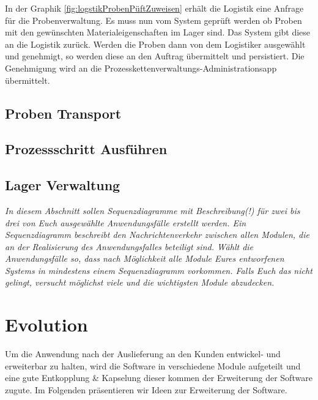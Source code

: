\documentclass[enabledeprecatedfontcommands,fontsize=12pt,paper=a4,twoside]{scrartcl}
\begin{document}
In der Graphik \ref{fig:logstikProbenPüftZuweisen} erhält die Logistik eine Anfrage für die Probenverwaltung. Es muss nun vom System geprüft werden ob Proben mit den gewünschten Materialeigenschaften im Lager sind. Das System gibt diese an die Logistik zurück. Werden die Proben dann von dem Logistiker ausgewählt und genehmigt, so werden diese an den Auftrag übermittelt und persistiert. Die Genehmigung wird an die Prozesskettenverwaltungs-Administrationsapp übermittelt.

\subsection{Proben Transport}
\subsection{Prozessschritt Ausführen}
\subsection{Lager Verwaltung}



{\it In diesem Abschnitt sollen Sequenzdiagramme mit Beschreibung(!)
  für zwei bis drei von Euch ausgewählte
    Anwendungsfälle
  erstellt werden. Ein Sequenzdiagramm beschreibt den
  Nachrichtenverkehr zwischen allen Modulen, die an der Realisierung
  des Anwendungsfalles beteiligt sind.  Wählt die
    Anwendungsfälle so, dass nach Möglichkeit alle Module Eures
    entworfenen Systems in mindestens einem Sequenzdiagramm
    vorkommen. Falls Euch das nicht gelingt, versucht möglichst viele
    und die wichtigsten Module abzudecken. }

\section{Evolution}

\label{sec:evolution}
Um die Anwendung nach der Auslieferung an den Kunden entwickel- und erweiterbar zu halten, wird die Software in verschiedene Module aufgeteilt und eine gute Entkopplung \& Kapselung dieser kommen der Erweiterung der Software zugute. Im Folgenden präsentieren wir Ideen zur Erweiterung der Software.
\end{document}
